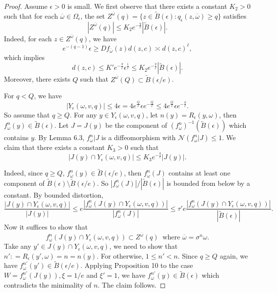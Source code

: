 \documentclass[11pt,oneside]{article}
\theoremstyle{plain}
\numberwithin{equation}{section}
\numberwithin{figure}{section}
\numberwithin{table}{section}
\begin{document}
\begin{proof}

Assume $\epsilon > 0$ is small. We first observe that there exists a constant $K_2>0$ such that for each $\overline \omega \in  \Omega_{\epsilon}$, the set $Z^{\overline \omega} (q) = \{ z \in \tilde B(\epsilon) : q_{\epsilon}(z, \overline \omega) \geq q\}$ satisfies 
\[
|Z^{\overline \omega} (q)| \leq K_2 e^{ -\frac{q}{\ell}} |\tilde B(\epsilon)|.
\]
Indeed, for each $z \in Z^{\overline \omega} (q)$, we have
\[
e^{-(q-1)} \epsilon \geq D f_{\overline \omega}(z) d (z, c) \asymp d(z, c)^{\ell},
\]
which implies 
\[
d(z, c) \leq K' e^{ -\frac{q}{\ell}} \epsilon^{\frac{1}{\ell}} \leq K_2 e^{ -\frac{q}{\ell}} |\tilde B(\epsilon)|.
\]
Moreover, there exists $Q$ such that $Z^{\overline \omega} (Q) \subset \tilde B(\epsilon / e)$.


For $q < Q$, we have
\[
|Y_{\epsilon} (\omega, v, q) | \leq 4 \epsilon = 4 e^{ \frac{Q}{\ell}} \epsilon e^{ -\frac{Q}{\ell}} \leq 4 e^{ \frac{Q}{\ell}} \epsilon e^{ -\frac{q}{\ell}}.
\]
So assume that $q \geq Q$. For any $y \in Y_{\epsilon} (\omega, v, q)$, let $n(y) = R_{\epsilon} (y, \omega)$, then $f_{\omega}^n(y) \in \tilde B(\epsilon)$. Let $J = J(y)$ be the component of $(f_{\omega}^n)^{-1} (\tilde B(\epsilon))$ which contains $y$. By Lemma 6.3, $f_{\omega}^n |J$ is a diffeomorphism with $\mathcal N(f_{\omega}^n| J) \leq 1$. We claim that there exists a constant $K_3 > 0$ such that
\begin{equation}
|J(y) \cap Y_{\epsilon} (\omega, v, q)| \leq K_3 e^{ -\frac{q}{\ell}} |J(y)|.
\end{equation}

Indeed, since $q \geq Q $, $f_{\omega}^n(y) \in \tilde B(\epsilon/e)$, then $f_{\omega}^n(J)$ contains at least one component of $\tilde B(\epsilon) \setminus \tilde B(\epsilon/e)$. So $ | f_{\omega}^n(J) | / | \tilde B(\epsilon) |$ is bounded from below by a constant.  By bounded distortion, 
\[
\frac{|J(y) \cap Y_{\epsilon} (\omega, v, q)|}{|J(y)|} \leq e \frac{ |f_{\omega}^n(J(y) \cap Y_{\epsilon} (\omega, v, q))|}{|f_{\omega}^n(J)| } \leq \tau' e \frac{ |f_{\omega}^n(J(y) \cap Y_{\epsilon} (\omega, v, q))|}{|\tilde B(\epsilon)| }.
\]
Now it suffices to show that 
\begin{equation}
f_{\omega}^n (J(y) \cap Y_{\epsilon} (\omega, v, q)) \subset Z^{\overline \omega}(q) \ \mbox{ where } \overline \omega = \sigma^n \omega.
\end{equation}
Take any $y' \in  J(y) \cap Y_{\epsilon} (\omega, v, q)$, we need to show that $n' : = R_{\epsilon}(y', \omega) = n = n(y)$. For otherwise, $1 \leq n' < n$. Since $q \geq Q$ again, we have $f_{\omega}^{n'} (y') \in \tilde B(\epsilon/e)$. Applying Proposition 10 to the case $W = f_{\omega}^{n'} (J(y)), \xi = 1/e$ and $\xi' = 1$, we have $f_{\omega}^{n'} (y) \in \tilde B(\epsilon)$ which contradicts the minimality of $n$. The claim follows.



\end{proof}
\end{document}
